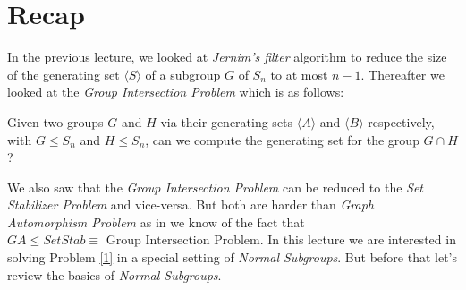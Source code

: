 
\section{Recap}
In the previous lecture, we looked at \emph{Jernim's filter} algorithm to reduce the size of the generating set $\langle S\rangle$ of a subgroup $G$ of $S_n$ to at most $n-1$. Thereafter we looked at the \emph{Group Intersection Problem} which is as follows:
\begin{problem}\label{1}
	Given two groups $G$ and $H$ via their generating sets $\langle A\rangle$ and $\langle B\rangle$ respectively, with $G\leq S_n$ and $H\leq S_n$, can we compute the generating set for the group $G\cap H$?
\end{problem}
We also saw that the \emph{Group Intersection Problem} can be reduced to the \emph{Set Stabilizer Problem} and vice-versa. But both are  harder than \emph{Graph Automorphism Problem} as in we know of the fact that $GA\leq SetStab\equiv\text{ Group Intersection Problem}$. In this lecture we are interested in solving Problem \ref{1} in a special setting of \emph{Normal Subgroups}. But before that let's review the basics of \emph{Normal Subgroups}.

